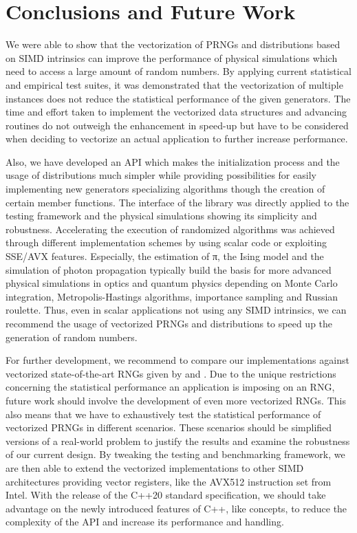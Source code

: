 \documentclass[crop=false]{stdlocal}
\begin{document}
\section{Conclusions and Future Work} %
\label{sec:conclusions}
  We were able to show that the vectorization of PRNGs and distributions based on SIMD intrinsics can improve the performance of physical simulations which need to access a large amount of random numbers.
  By applying current statistical and empirical test suites, it was demonstrated that the vectorization of multiple instances does not reduce the statistical performance of the given generators.
  The time and effort taken to implement the vectorized data structures and advancing routines do not outweigh the enhancement in speed-up but have to be considered when deciding to vectorize an actual application to further increase performance.

  Also, we have developed an API which makes the initialization process and the usage of distributions much simpler while providing possibilities for easily implementing new generators specializing algorithms though the creation of certain member functions.
  The interface of the library was directly applied to the testing framework and the physical simulations showing its simplicity and robustness.
  Accelerating the execution of randomized algorithms was achieved through different implementation schemes by using scalar code or exploiting SSE/AVX features.
  Especially, the estimation of π, the Ising model and the simulation of photon propagation typically build the basis for more advanced physical simulations in optics and quantum physics depending on Monte Carlo integration, Metropolis-Hastings algorithms, importance sampling and Russian roulette.
  Thus, even in scalar applications not using any SIMD intrinsics, we can recommend the usage of vectorized PRNGs and distributions to speed up the generation of random numbers.

  For further development, we recommend to compare our implementations against vectorized state-of-the-art RNGs given by  and .
  Due to the unique restrictions concerning the statistical performance an application is imposing on an RNG, future work should involve the development of even more vectorized RNGs.
  This also means that we have to exhaustively test the statistical performance of vectorized PRNGs in different scenarios.
  These scenarios should be simplified versions of a real-world problem to justify the results and examine the robustness of our current design.
  By tweaking the testing and benchmarking framework, we are then able to extend the vectorized implementations to other SIMD architectures providing vector registers, like the AVX512 instruction set from Intel.
  With the release of the C++20 standard specification, we should take advantage on the newly introduced features of C++, like concepts, to reduce the complexity of the API and increase its performance and handling.
\end{document}
